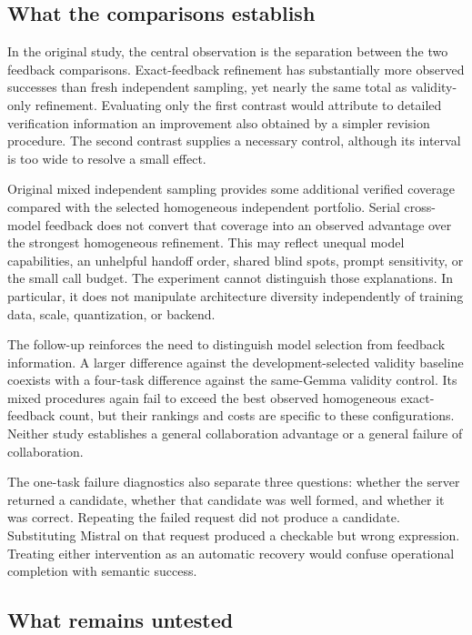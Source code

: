 \subsection{What the comparisons establish}

In the original study, the central observation is the separation between the two feedback comparisons. Exact-feedback refinement has substantially more observed successes than fresh independent sampling, yet nearly the same total as validity-only refinement. Evaluating only the first contrast would attribute to detailed verification information an improvement also obtained by a simpler revision procedure. The second contrast supplies a necessary control, although its interval is too wide to resolve a small effect.

Original mixed independent sampling provides some additional verified coverage compared with the selected homogeneous independent portfolio. Serial cross-model feedback does not convert that coverage into an observed advantage over the strongest homogeneous refinement. This may reflect unequal model capabilities, an unhelpful handoff order, shared blind spots, prompt sensitivity, or the small call budget. The experiment cannot distinguish those explanations. In particular, it does not manipulate architecture diversity independently of training data, scale, quantization, or backend.

The follow-up reinforces the need to distinguish model selection from feedback information. A larger difference against the development-selected validity baseline coexists with a four-task difference against the same-Gemma validity control. Its mixed procedures again fail to exceed the best observed homogeneous exact-feedback count, but their rankings and costs are specific to these configurations. Neither study establishes a general collaboration advantage or a general failure of collaboration.

The one-task failure diagnostics also separate three questions: whether the server returned a candidate, whether that candidate was well formed, and whether it was correct. Repeating the failed request did not produce a candidate. Substituting Mistral on that request produced a checkable but wrong expression. Treating either intervention as an automatic recovery would confuse operational completion with semantic success.

\subsection{What remains untested}

